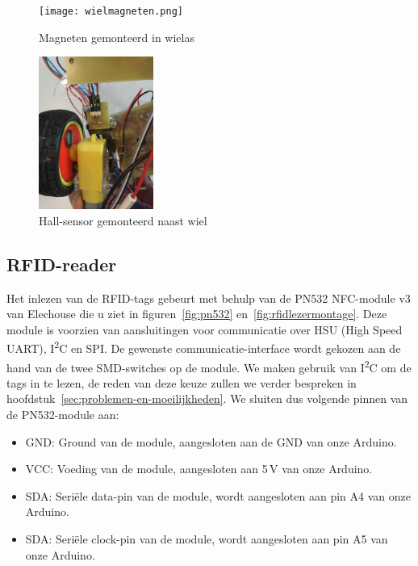 \begin{figure}[H]
	\centering
	\begin{minipage}[b]{0.4\textwidth}
		\centering
		\texttt{[image: wielmagneten.png]}
		\caption{Magneten gemonteerd in wielas\label{fig:wielmagneten}}
	\end{minipage}
	\hfill
	\begin{minipage}[b]{0.4\textwidth}
		\centering
		\includegraphics[height=5cm]{hallsensor.png}
		\caption{Hall-sensor gemonteerd naast wiel\label{fig:hallsensor}}
	\end{minipage}
\end{figure}

\subsection{RFID-reader}
Het inlezen van de RFID-tags gebeurt met behulp van de PN532 NFC-module v3 van Elechouse die u ziet in figuren~\ref{fig:pn532} en~\ref{fig:rfidlezermontage}. Deze module is voorzien van aansluitingen voor communicatie over HSU (High Speed UART), I\textsuperscript{2}C en SPI. De gewenste communicatie-interface wordt gekozen aan de hand van de twee SMD-switches op de module. We maken gebruik van I\textsuperscript{2}C om de tags in te lezen, de reden van deze keuze zullen we verder bespreken in hoofdstuk~\vref{sec:problemen-en-moeilijkheden}. We sluiten dus volgende pinnen van de PN532-module aan:
\begin{itemize}
	\item GND: Ground van de module, aangesloten aan de GND van onze Arduino.
	\item VCC: Voeding van de module, aangesloten aan 5\,V van onze Arduino.
	\item SDA: Seri\"ele data-pin van de module, wordt aangesloten aan pin A4 van onze Arduino.
	\item SDA: Seri\"ele clock-pin van de module, wordt aangesloten aan pin A5 van onze Arduino.
\end{itemize}


